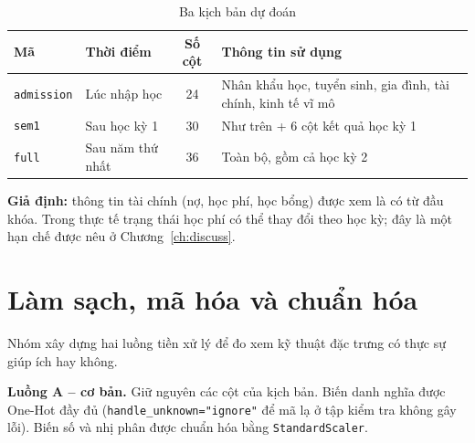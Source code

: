 \documentclass[12pt,a4paper,oneside]{report}
\newcommand{\code}[1]{\texttt{#1}}
\begin{document}
\begin{table}[H]
\centering
\caption{Ba kịch bản dự đoán}\label{tab:scen}
\begin{tabularx}{\textwidth}{@{}llcX@{}}
\toprule
\textbf{Mã} & \textbf{Thời điểm} & \textbf{Số cột} & \textbf{Thông tin sử dụng}\\
\midrule
\code{admission} & Lúc nhập học & 24 & Nhân khẩu học, tuyển sinh, gia đình, tài chính, kinh tế vĩ mô\\
\code{sem1} & Sau học kỳ 1 & 30 & Như trên + 6 cột kết quả học kỳ 1\\
\code{full} & Sau năm thứ nhất & 36 & Toàn bộ, gồm cả học kỳ 2\\
\bottomrule
\end{tabularx}
\end{table}
\textbf{Giả định:} thông tin tài chính (nợ, học phí, học bổng) được xem là có từ đầu khóa. Trong thực tế trạng thái học phí
có thể thay đổi theo học kỳ; đây là một hạn chế được nêu ở Chương~\ref{ch:discuss}.

\section{Làm sạch, mã hóa và chuẩn hóa}
Nhóm xây dựng hai luồng tiền xử lý để đo xem kỹ thuật đặc trưng có thực sự giúp ích hay không.

\textbf{Luồng A -- cơ bản.} Giữ nguyên các cột của kịch bản. Biến danh nghĩa được One-Hot đầy đủ
(\code{handle\_unknown="ignore"} để mã lạ ở tập kiểm tra không gây lỗi). Biến số và nhị phân được chuẩn hóa bằng
\code{StandardScaler}.
\end{document}
